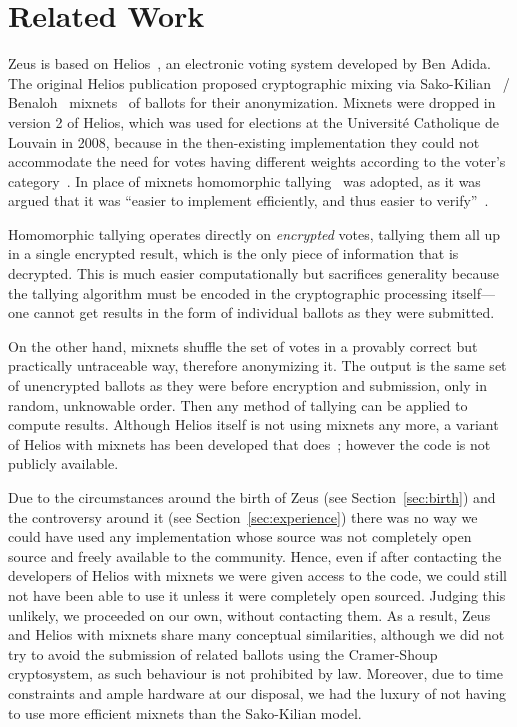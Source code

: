 \documentclass[jets]{usenixjournal}
\begin{document}
\section{Related Work}
\label{sec:related}

Zeus is based on Helios~\cite{adida:2008}, an electronic voting system
developed by Ben Adida. The original Helios publication
\cite{adida:2008} proposed cryptographic mixing via
Sako-Kilian~\cite{sako:1995} / Benaloh~\cite{benaloh:2006}
mixnets~\cite{sako:1995} of ballots for their anonymization. Mixnets
were dropped in version 2 of Helios, which was used for elections at
the Universit\'{e} Catholique de Louvain in 2008, because in the
then-existing implementation they could not accommodate the need for
votes having different weights according to the voter's
category~\cite{adida:2009}. In place of mixnets homomorphic
tallying~\cite{cohen:1985} was adopted, as it was argued that it was
``easier to implement efficiently, and thus easier to
verify''~\cite{adida:2009}.

Homomorphic tallying operates directly on \emph{encrypted} votes,
tallying them all up in a single encrypted result, which is the only
piece of information that is decrypted. This is much easier
computationally but sacrifices generality because the tallying
algorithm must be encoded in the cryptographic processing itself---one
cannot get results in the form of individual ballots as they were
submitted.

On the other hand, mixnets shuffle the set of votes in a provably
correct but practically untraceable way, therefore anonymizing it. The
output is the same set of unencrypted ballots as they were before
encryption and submission, only in random, unknowable order. Then any
method of tallying can be applied to compute results. Although Helios
itself is not using mixnets any more, a variant of Helios with mixnets
has been developed that does~\cite{bulens:2011}; however the code is
not publicly available. 

Due to the circumstances around the birth of Zeus (see
Section~\ref{sec:birth}) and the controversy around it (see
Section~\ref{sec:experience}) there was no way we could have used any
implementation whose source was not completely open source and
freely available to the community. Hence, even if after contacting the
developers of Helios with mixnets we were given access to the code, we
could still not have been able to use it unless it were completely
open sourced. Judging this unlikely, we proceeded on our own, without
contacting them. As a result, Zeus and Helios with mixnets share
many conceptual similarities, although we did not try to avoid the
submission of related ballots using the Cramer-Shoup cryptosystem, as
such behaviour is not prohibited by law. Moreover, due to time
constraints and ample hardware at our disposal, we had the luxury of
not having to use more efficient mixnets than the Sako-Kilian
model. 
\end{document}
